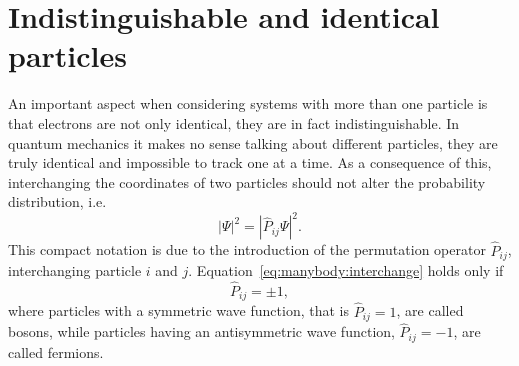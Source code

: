 \section{Indistinguishable and identical particles}
An important aspect when considering systems with more than one particle is that electrons are not only identical, they are in fact indistinguishable.
In quantum mechanics it makes no sense talking about different particles, they are truly identical and impossible to track one at a time.
As a consequence of this, interchanging the coordinates of two particles should not alter the probability distribution, i.e.
\begin{equation}
\label{eq:manybody:interchange}
| \Psi |^2
=
|\hat{P}_{ij} \Psi |^2 .
\end{equation}
This compact notation is due to the introduction of the permutation operator $\hat{P}_{ij}$, interchanging particle $i$ and $j$. Equation~\eqref{eq:manybody:interchange} holds only if
\begin{equation}
\hat{P}_{ij} = \pm 1 ,
\end{equation}
where particles with a symmetric wave function, that is $\hat{P}_{ij} = 1$, are called bosons, while particles having an antisymmetric wave function, $\hat{P}_{ij} = -1$, are called fermions.

